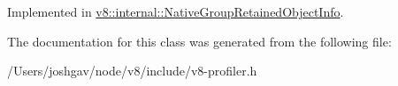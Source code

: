 Implemented in \hyperlink{classv8_1_1internal_1_1_native_group_retained_object_info_a6c6bbdecc0a199cd5a79520161d02a1f}{v8\+::internal\+::\+Native\+Group\+Retained\+Object\+Info}.



The documentation for this class was generated from the following file\+:\begin{DoxyCompactItemize}
\item 
/\+Users/joshgav/node/v8/include/v8-\/profiler.\+h\end{DoxyCompactItemize}
